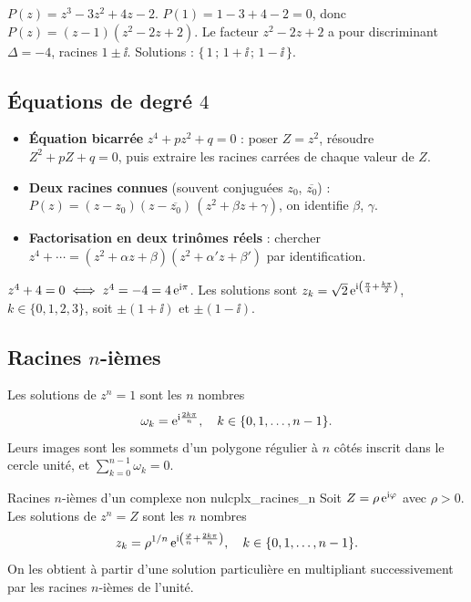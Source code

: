 \begin{exemple}
	$P(z) = z^3 - 3z^2 + 4z - 2$. $P(1) = 1 - 3 + 4 - 2 = 0$, donc
	$P(z) = (z - 1)(z^2 - 2z + 2)$. Le facteur $z^2 - 2z + 2$ a pour
	discriminant $\Delta = -4$, racines $1 \pm \ii$.
	Solutions : $\{\,1\,;\,1+\ii\,;\,1-\ii\,\}$.
\end{exemple}

\subsection{Équations de degré $4$}

\begin{methode}
	\begin{itemize}[label=\textbullet]
		\item \textbf{Équation bicarrée} $z^4 + p z^2 + q = 0$ : poser
		$Z = z^2$, résoudre $Z^2 + pZ + q = 0$, puis extraire les racines
		carrées de chaque valeur de $Z$.
		\item \textbf{Deux racines connues} (souvent conjuguées $z_0$,
		$\overline{z_0}$) : $P(z) = (z - z_0)(z - \overline{z_0})\,(z^2 + \beta z + \gamma)$,
		on identifie $\beta$, $\gamma$.
		\item \textbf{Factorisation en deux trinômes réels} : chercher
		$z^4 + \cdots = (z^2 + \alpha z + \beta)(z^2 + \alpha' z + \beta')$
		par identification.
	\end{itemize}
\end{methode}

\begin{exemple}
	$z^4 + 4 = 0 \iff z^4 = -4 = 4\,\mathrm{e}^{\mathrm{i}\pi}$. Les solutions sont
	$z_k = \sqrt{2}\,\mathrm{e}^{\mathrm{i}\left(\frac{\pi}{4} + \frac{k\pi}{2}\right)}$,
	$k \in \{0,1,2,3\}$, soit $\pm(1 + \ii)$ et $\pm(1 - \ii)$.
\end{exemple}

\subsection{Racines $n$-ièmes}

\begin{theoreme}
	Les solutions de $z^n = 1$ sont les $n$ nombres
	$$
	\omega_k = \mathrm{e}^{\mathrm{i}\frac{2k\pi}{n}}, \quad k \in \{0, 1, \ldots, n-1\}.
	$$
	Leurs images sont les sommets d'un polygone régulier à $n$ côtés inscrit
	dans le cercle unité, et $\displaystyle\sum_{k=0}^{n-1}\omega_k = 0$.
\end{theoreme}

\begin{propriete}{Racines $n$-ièmes d'un complexe non nul}{cplx_racines_n}
	Soit $Z = \rho\,\mathrm{e}^{\mathrm{i}\varphi}$ avec $\rho > 0$. Les solutions de $z^n = Z$
	sont les $n$ nombres
	$$
	z_k = \rho^{1/n}\,\mathrm{e}^{\mathrm{i}\left(\frac{\varphi}{n} + \frac{2k\pi}{n}\right)},
	\quad k \in \{0,1,\ldots,n-1\}.
	$$
	On les obtient à partir d'une solution particulière en multipliant
	successivement par les racines $n$-ièmes de l'unité.
\end{propriete}

